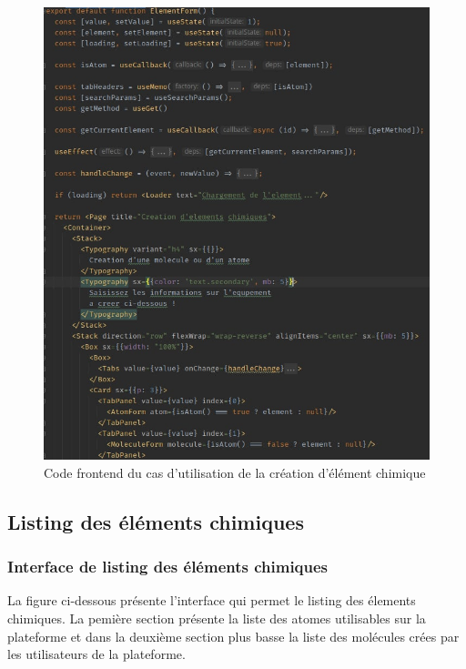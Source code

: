 \begin{figure}[H]
	\centering
	\includegraphics[width=1\textwidth]{img/fec}
	\caption{Code frontend du cas d'utilisation de la création d'élément chimique}
	\label{fig:mesh1}
\end{figure}

\subsection{Listing des éléments chimiques}

\subsubsection{Interface de listing des éléments chimiques}

La figure ci-dessous présente l'interface qui permet le listing des élements chimiques. 
La pemière section présente la liste des atomes utilisables sur la plateforme et dans la deuxième section plus basse la liste des molécules crées par les utilisateurs de la plateforme. 

